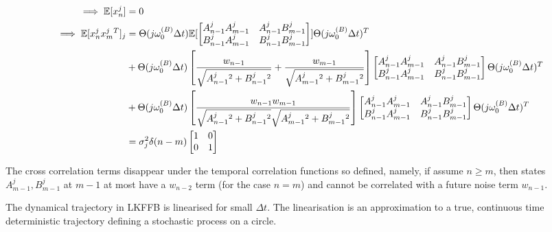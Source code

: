 \begin{align}
\implies \mathbb{E}[x^j_n] &= 0 \\
\implies \mathbb{E}[x^j_n x^j_m{}^T]_j & =   \Theta(j \omega_0^{(B)} \Delta t) \mathbb{E}[\begin{bmatrix} A^j_{n-1}A^j_{m-1} & A^j_{n-1}B^j_{m-1}\\ B^j_{n-1}A^j_{m-1} & B^j_{n-1}B^j_{m-1}\\ \end{bmatrix}] \Theta(j \omega_0^{(B)} \Delta t)^T \label{eqn:cov_kf_term1}\\
& +   \Theta(j \omega_0^{(B)} \Delta t) \left[\frac{w_{n-1}}{\sqrt{A^j_{n-1}{}^2 + B^j_{n-1}{}^2}} + \frac{w_{m-1}}{\sqrt{A^j_{m-1}{}^2 + B^j_{m-1}{}^2}} \right]\begin{bmatrix} A^j_{n-1}A^j_{m-1} & A^j_{n-1}B^j_{m-1}\\ B^j_{n-1}A^j_{m-1} & B^j_{n-1}B^j_{m-1}\\ \end{bmatrix} \Theta(j \omega_0^{(B)} \Delta t)^T  \label{eqn:cov_kf_term2}\\
& +   \Theta(j \omega_0^{(B)} \Delta t) \left[\frac{w_{n-1}w_{m-1}}{\sqrt{A^j_{n-1}{}^2 + B^j_{n-1}{}^2}\sqrt{A^j_{m-1}{}^2 + B^j_{m-1}{}^2}} \right]\begin{bmatrix} A^j_{n-1}A^j_{m-1} & A^j_{n-1}B^j_{m-1}\\ B^j_{n-1}A^j_{m-1} & B^j_{n-1}B^j_{m-1}\\ \end{bmatrix} \Theta(j \omega_0^{(B)} \Delta t)^T \label{eqn:cov_kf_term3} \\
& = \sigma^2_j \delta(n-m) \begin{bmatrix} 
1 & 0 \\ 
0 & 1  \\
\end{bmatrix} \label{eqn:cov_kf_term4}
 \end{align}

The cross correlation terms disappear under the temporal correlation functions so defined, namely, if assume $n \geq m$, then states $A^j_{m-1}, B^j_{m-1}$ at $m-1$ at most have a $w_{n-2}$ term (for the case $n=m$) and cannot be correlated with a future noise term $w_{n-1}$. 

The dynamical trajectory in LKFFB is linearised for small $\Delta t$.  The linearisation is an approximation to a true, continuous time deterministic trajectory defining a stochastic process on a circle. 

